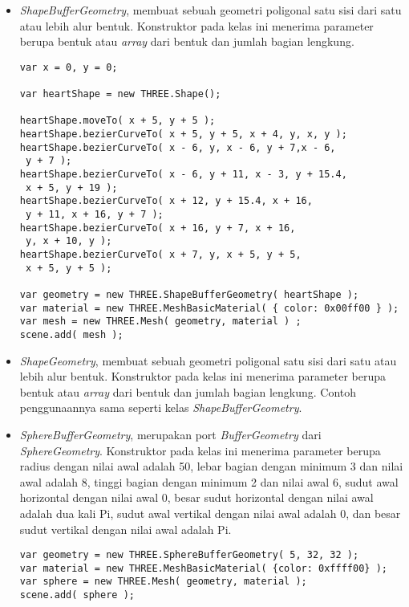 \begin{itemize}
\begin{itemize}
	\item {\it ShapeBufferGeometry}, membuat sebuah geometri poligonal satu sisi dari satu atau lebih alur bentuk. Konstruktor pada kelas ini menerima parameter berupa bentuk atau {\it array} dari bentuk dan jumlah bagian lengkung.
	
\begin{lstlisting}[caption={Contoh penggunaan kelas {\it ShapeBufferGeometry}.},captionpos=b]
var x = 0, y = 0;

var heartShape = new THREE.Shape();

heartShape.moveTo( x + 5, y + 5 );
heartShape.bezierCurveTo( x + 5, y + 5, x + 4, y, x, y );
heartShape.bezierCurveTo( x - 6, y, x - 6, y + 7,x - 6,
 y + 7 );
heartShape.bezierCurveTo( x - 6, y + 11, x - 3, y + 15.4,
 x + 5, y + 19 );
heartShape.bezierCurveTo( x + 12, y + 15.4, x + 16,
 y + 11, x + 16, y + 7 );
heartShape.bezierCurveTo( x + 16, y + 7, x + 16,
 y, x + 10, y );
heartShape.bezierCurveTo( x + 7, y, x + 5, y + 5,
 x + 5, y + 5 );

var geometry = new THREE.ShapeBufferGeometry( heartShape );
var material = new THREE.MeshBasicMaterial( { color: 0x00ff00 } );
var mesh = new THREE.Mesh( geometry, material ) ;
scene.add( mesh );
\end{lstlisting}

	\item {\it ShapeGeometry}, membuat sebuah geometri poligonal satu sisi dari satu atau lebih alur bentuk. Konstruktor pada kelas ini menerima parameter berupa bentuk atau {\it array} dari bentuk dan jumlah bagian lengkung. Contoh penggunaannya sama seperti kelas {\it ShapeBufferGeometry}.

	\item {\it SphereBufferGeometry}, merupakan port {\it BufferGeometry} dari {\it SphereGeometry}. Konstruktor pada kelas ini menerima parameter berupa radius dengan nilai awal adalah 50, lebar bagian dengan minimum 3 dan nilai awal adalah 8, tinggi bagian dengan minimum 2 dan nilai awal 6, sudut awal horizontal dengan nilai awal 0, besar sudut horizontal dengan nilai awal adalah dua kali Pi, sudut awal vertikal dengan nilai awal adalah 0, dan besar sudut vertikal dengan nilai awal adalah Pi.
	
\begin{lstlisting}[caption={Contoh penggunaan kelas {\it SphereBufferGeometry}.},captionpos=b]
var geometry = new THREE.SphereBufferGeometry( 5, 32, 32 );
var material = new THREE.MeshBasicMaterial( {color: 0xffff00} );
var sphere = new THREE.Mesh( geometry, material );
scene.add( sphere );
\end{lstlisting}


\end{itemize}
\end{itemize}
